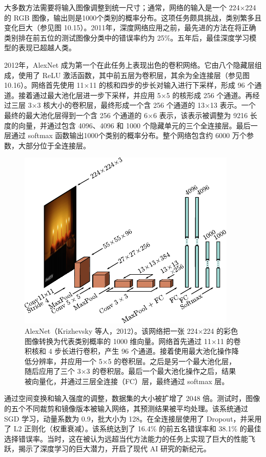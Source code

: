 \documentclass[lang=cn,newtx,10pt,scheme=chinese]{elegantbook}
\begin{document}
大多数方法需要将输入图像调整到统一尺寸；通常，网络的输入是一个 224×224 的 RGB 图像，输出则是1000个类别的概率分布。这项任务颇具挑战，类别繁多且变化巨大（参见图 10.15）。2011年，深度网络应用之前，最先进的方法在将正确类别排在前五位的测试图像分类中的错误率约为 25\%。五年后，最佳深度学习模型的表现已超越人类。

2012年，AlexNet 成为第一个在此任务上表现出色的卷积网络。它由八个隐藏层组成，使用了 ReLU 激活函数，其中前五层为卷积层，其余为全连接层（参见图 10.16）。网络首先使用 11×11 的核和四步的步长对输入进行下采样，形成 96 个通道。接着通过最大池化层进一步下采样，并应用 5×5 的核形成 256 个通道。再经过三层 3×3 核大小的卷积层，最终形成一个含 256 个通道的 13×13 表示。一个最终的最大池化层得到一个含 256 个通道的 6×6 表示，该表示被调整为 9216 长度的向量，并通过包含 4096、4096 和 1000 个隐藏单元的三个全连接层。最后一层通过 softmax 函数输出1000个类别的概率分布。整个网络包含约 6000 万个参数，大部分位于全连接层。

\begin{figure}[ht!]
	\centering
	\includegraphics[width=0.7\linewidth]{PDFFigures/UDLChap10PDF/ConvAlex.pdf}
	\caption{AlexNet（Krizhevsky 等人，2012）。该网络把一张 224×224 的彩色图像转换为代表类别概率的 1000 维向量。网络首先通过 11×11 的卷积核和 4 步长进行卷积，产生 96 个通道。接着使用最大池化操作降低分辨率，并应用一个 5×5 的卷积层。之后是另一个最大池化层，随后应用了三个 3×3 的卷积层。最后一个最大池化操作之后，结果被向量化，并通过三层全连接（FC）层，最终通过 softmax 层。}
\end{figure}


通过空间变换和输入强度的调整，数据集的大小被扩增了 2048 倍。测试时，图像的五个不同裁剪和镜像版本被输入网络，其预测结果被平均处理。该系统通过 SGD 学习，动量系数为 0.9，批大小为 128。在全连接层使用了 Dropout，并采用了 L2 正则化（权重衰减）。该系统达到了 16.4\% 的前五名错误率和 38.1\% 的最佳选择错误率。当时，这在被认为远超当代方法能力的任务上实现了巨大的性能飞跃，揭示了深度学习的巨大潜力，开启了现代 AI 研究的新纪元。
\end{document}
